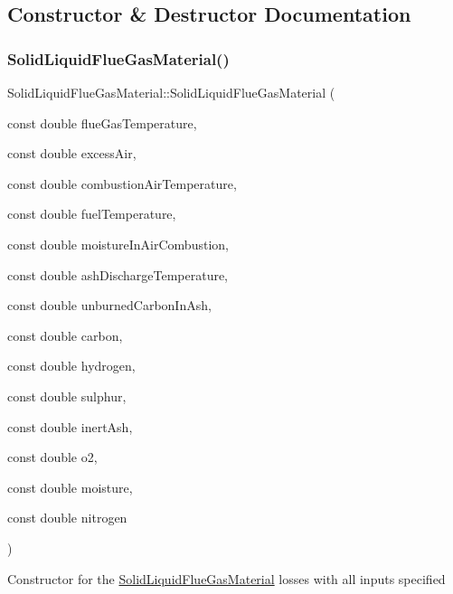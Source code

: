 \subsection{Constructor \& Destructor Documentation}
\mbox{\label{class_solid_liquid_flue_gas_material_a91e7c5e670b3db4fedcbc494448644d5}} 
\subsubsection{\texorpdfstring{Solid\+Liquid\+Flue\+Gas\+Material()}{SolidLiquidFlueGasMaterial()}}
{\footnotesize\ttfamily Solid\+Liquid\+Flue\+Gas\+Material\+::\+Solid\+Liquid\+Flue\+Gas\+Material (\begin{DoxyParamCaption}\item[{const double}]{flue\+Gas\+Temperature,  }\item[{const double}]{excess\+Air,  }\item[{const double}]{combustion\+Air\+Temperature,  }\item[{const double}]{fuel\+Temperature,  }\item[{const double}]{moisture\+In\+Air\+Combustion,  }\item[{const double}]{ash\+Discharge\+Temperature,  }\item[{const double}]{unburned\+Carbon\+In\+Ash,  }\item[{const double}]{carbon,  }\item[{const double}]{hydrogen,  }\item[{const double}]{sulphur,  }\item[{const double}]{inert\+Ash,  }\item[{const double}]{o2,  }\item[{const double}]{moisture,  }\item[{const double}]{nitrogen }\end{DoxyParamCaption})\hspace{0.3cm}{\ttfamily [inline]}}

Constructor for the \hyperlink{class_solid_liquid_flue_gas_material}{Solid\+Liquid\+Flue\+Gas\+Material} losses with all inputs specified


